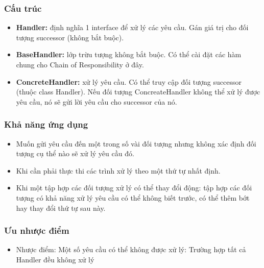 \subsubsection{Cấu trúc}
\begin{flushleft}
	\begin{itemize}
		\item \textbf{Handler:} định nghĩa 1 interface để xử lý các yêu cầu. Gán giá trị cho đối tượng successor (không bắt buộc).
		\item \textbf{BaseHandler:} lớp trừu tượng không bắt buộc. Có thể cài đặt các hàm chung cho Chain of Responsibility ở đây.
		\item \textbf{ConcreteHandler:} xử lý yêu cầu. Có thể truy cập đối tượng successor (thuộc class Handler). Nếu đối tượng ConcreateHandler không thể xử lý được yêu cầu, nó sẽ gửi lời yêu cầu cho successor của nó.
	\end{itemize}
\end{flushleft}

\subsubsection{Khả năng ứng dụng}
\begin{flushleft}
	\begin{itemize}
		\item Muốn gửi yêu cầu đến một trong số vài đối tượng nhưng không xác định đối tượng cụ thể nào sẽ xử lý yêu cầu đó.
		\item Khi cần phải thực thi các trình xử lý theo một thứ tự nhất định.
		\item Khi một tập hợp các đối tượng xử lý có thể thay đổi động: tập hợp các đối tượng có khả năng xử lý yêu cầu có thể không biết trước, có thể thêm bớt hay thay đổi thứ tự sau này.
	\end{itemize}
\end{flushleft}

\subsubsection{Ưu nhược điểm}
\begin{flushleft}
	\begin{itemize}
		\item Nhược điểm: Một số yêu cầu có thể không được xử lý: Trường hợp tất cả Handler đều không xử lý
	\end{itemize}
\end{flushleft}
